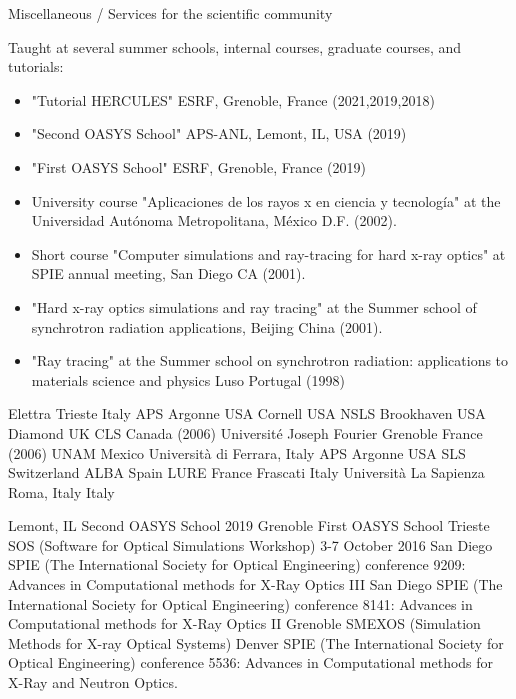 \begin{rubric}{Miscellaneous / Services for the scientific community}

\entry*[] Taught at several summer schools, internal courses, graduate courses, and tutorials:
\begin{itemize}
\item "Tutorial HERCULES" ESRF, Grenoble, France (2021,2019,2018)
\item "Second OASYS School" APS-ANL, Lemont, IL, USA (2019)
\item "First OASYS School" ESRF, Grenoble, France (2019)
\item University course "Aplicaciones de los rayos x en ciencia y tecnología" at the Universidad
Autónoma Metropolitana, México D.F. (2002). 
\item Short course "Computer simulations and ray-tracing for hard x-ray optics" at SPIE annual
meeting, San Diego CA (2001).
\item "Hard x-ray optics simulations and ray tracing" at the Summer school of synchrotron radiation applications, Beijing China (2001).
\item "Ray tracing" at the Summer school on synchrotron radiation: applications to materials science and physics Luso Portugal (1998)
\end{itemize}



\entry*[2016] Elettra Trieste Italy
\entry*[2013] APS Argonne USA
\entry*[2011] Cornell USA
\entry*[2010] NSLS Brookhaven USA
\entry*[2009] Diamond UK
\entry*[2006] CLS Canada (2006)
\entry*[2006] Universit\'e Joseph Fourier Grenoble France (2006)
\entry*[2005 -- 2002] UNAM Mexico
\entry*[2001] Universit\`a di Ferrara, Italy
\entry*[2002] APS Argonne USA
\entry*[1998] SLS Switzerland
\entry*[1996] ALBA Spain
\entry*[1992] LURE France
\entry*[1992] Frascati Italy
\entry*[1991] Universit\`a La Sapienza Roma, Italy Italy

\entry*[2019] Lemont, IL Second OASYS School 2019
\entry*[2019] Grenoble First OASYS School
\entry*[2016] Trieste SOS (Software for Optical Simulations Workshop) 3-7 October 2016
\entry*[2014] San Diego SPIE (The International Society for Optical Engineering) conference 9209: Advances in Computational methods for X-Ray Optics III
\entry*[2011] San Diego SPIE (The International Society for Optical Engineering) conference 8141: Advances in Computational methods for X-Ray Optics II
\entry*[2009] Grenoble SMEXOS (Simulation Methods for X-ray Optical Systems)
 Denver SPIE (The International Society for Optical Engineering) conference 5536: Advances in Computational methods for X-Ray and Neutron Optics.


\end{rubric}
